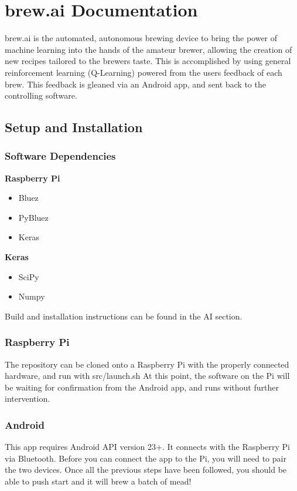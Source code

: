 \section{brew.ai Documentation}

brew.ai is the automated, autonomous brewing device to bring the power of machine learning into the hands of the amateur brewer, allowing the creation of new recipes tailored to the brewers taste.
This is accomplished by using general reinforcement learning (Q-Learning) powered from the users feedback of each brew.
This feedback is gleaned via an Android app, and sent back to the controlling software.

\subsection{Setup and Installation}
\subsubsection{Software Dependencies}

\textbf{Raspberry Pi}
\begin{itemize}
\item Bluez
\item PyBluez
\item Keras
\end{itemize}

\textbf{Keras}
\begin{itemize}
\item SciPy
\item Numpy
\end{itemize}

Build and installation instructions can be found in the AI section. \\

\subsubsection{Raspberry Pi}
The repository can be cloned onto a Raspberry Pi with the properly connected hardware, and run with src/launch.sh
At this point, the software on the Pi will be waiting for confirmation from the Android app, and runs without further intervention. \\

\subsubsection{Android}
This app requires Android API version 23+. It connects with the Raspberry Pi via Bluetooth.
Before you can connect the app to the Pi, you will need to pair the two devices.
Once all the previous steps have been followed, you should be able to push start and it will brew a batch of mead! \\

